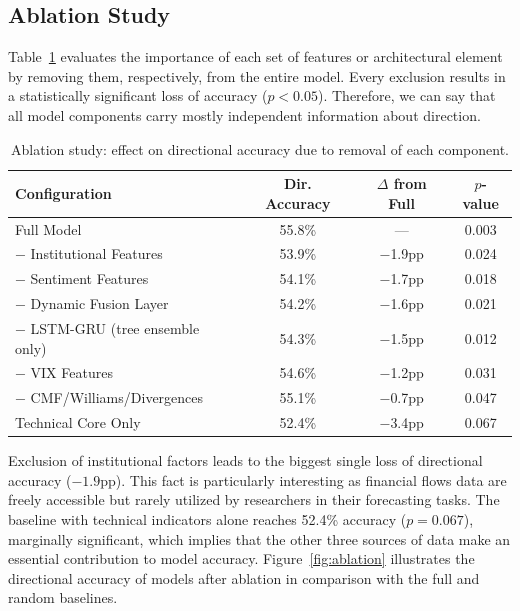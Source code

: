 \documentclass[10pt,a4paper,twoside]{article}
\begin{document}
\subsection{Ablation Study}

Table~\ref{tab:ablation} evaluates the importance of each set of features or architectural element by removing them, respectively, from the entire model. Every exclusion results in a statistically significant loss of accuracy ($p < 0.05$). Therefore, we can say that all model components carry mostly independent information about direction.

\begin{table}[htb]
  \begin{center}
    {\caption{Ablation study: effect on directional accuracy due to removal of each component.}\label{tab:ablation}}
    \begin{tabular}{|l|c|c|c|}
    \hline
    \textbf{Configuration} & \textbf{Dir. Accuracy} & \textbf{$\Delta$ from Full} & \textbf{$p$-value} \\
    \hline
    Full Model & 55.8\% & --- & 0.003 \\
    $-$ Institutional Features & 53.9\% & $-$1.9pp & 0.024 \\
    $-$ Sentiment Features & 54.1\% & $-$1.7pp & 0.018 \\
    $-$ Dynamic Fusion Layer & 54.2\% & $-$1.6pp & 0.021 \\
    $-$ LSTM-GRU (tree ensemble only) & 54.3\% & $-$1.5pp & 0.012 \\
    $-$ VIX Features & 54.6\% & $-$1.2pp & 0.031 \\
    $-$ CMF/Williams/Divergences & 55.1\% & $-$0.7pp & 0.047 \\
    Technical Core Only & 52.4\% & $-$3.4pp & 0.067 \\
    \hline
    \end{tabular}
  \end{center}
\end{table}

Exclusion of institutional factors leads to the biggest single loss of directional accuracy ($-1.9$pp). This fact is particularly interesting as financial flows data are freely accessible but rarely utilized by researchers in their forecasting tasks. The baseline with technical indicators alone reaches 52.4\% accuracy ($p = 0.067$), marginally significant, which implies that the other three sources of data make an essential contribution to model accuracy. Figure~\ref{fig:ablation} illustrates the directional accuracy of models after ablation in comparison with the full and random baselines.
\end{document}
